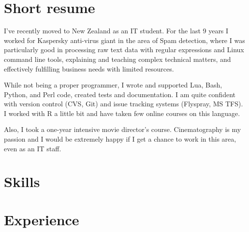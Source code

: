 \documentclass[11pt,a4paper,sans]{moderncv}        %
\begin{document}
\makecvtitle

\section{Short resume}

I've recently moved to New Zealand as an IT student. For the last 9 years I worked for Kaspersky anti-virus giant in the area of Spam detection, where I was particularly good in processing raw text data with regular expressions and Linux command line tools, explaining and teaching complex technical matters, and effectively fulfilling business needs with limited resources.
\par\medskip
While not being a proper programmer, I wrote and supported Lua, Bash, Python, and Perl code, created tests and documentation. I am quite confident with version control (CVS, Git) and issue tracking systems (Flyspray, MS TFS). I worked with R a little bit and have taken few online courses on this language.
\par\medskip
Also, I took a one-year intensive movie director's course. Cinematography is my passion and I would be extremely happy if I get a chance to work in this area, even as an IT staff.



\section{Skills}


\section{Experience}
\end{document}
